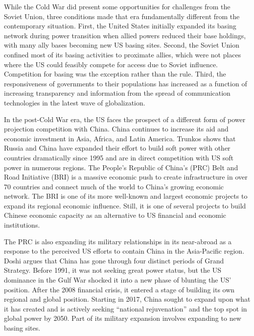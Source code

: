 While the Cold War did present some opportunities for challenges from the Soviet Union, three conditions made that era fundamentally different from the contemporary situation. First, the United States initially expanded its basing network during power transition when allied powers reduced their base holdings, with many ally bases becoming new US basing sites. Second, the Soviet Union confined most of its basing activities to proximate allies, which were not places where the US could feasibly compete for access due to Soviet influence. Competition for basing was the exception rather than the rule.\autocite{Nieman2020} Third, the responsiveness of governments to their populations has increased as a function of increasing transparency and information from the spread of communication technologies in the latest wave of globalization.

In the post-Cold War era, the US faces the prospect of a different form of power projection competition with China. China continues to increase its aid and economic investment in Asia, Africa, and Latin America. Trunkos shows that Russia and China have expanded their effort to build soft power with other countries dramatically since 1995 and are in direct competition with US soft power in numerous regions.\autocite{Trunkos2020} The People's Republic of China's (PRC) Belt and Road Initiative (BRI) is a massive economic push to create infrastructure in over 70 countries and connect much of the world to China's growing economic network.  The BRI is one of its more well-known and largest economic projects to expand its regional economic influence. Still, it is one of several projects to build Chinese economic capacity as an alternative to US financial and economic institutions.\autocite{Doshi2021}

The PRC is also expanding its military relationships in its near-abroad as a response to the perceived US efforts to contain China in the Asia-Pacific region.\autocite{Yao2019} Doshi argues that China has gone through four distinct periods of Grand Strategy.\autocite{Doshi2021} Before 1991, it was not seeking great power status, but the US dominance in the Gulf War shocked it into a new phase of blunting the US' position. After the 2008 financial crisis, it entered a stage of building its own regional and global position. Starting in 2017, China sought to expand upon what it has created and is actively seeking ``national rejuvenation'' and the top spot in global power by 2050. Part of its military expansion involves expanding to new basing sites.

